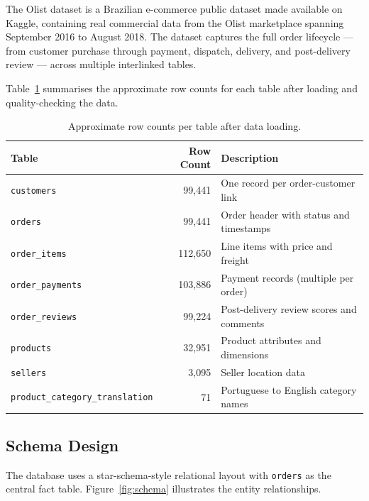 \documentclass[12pt,a4paper]{article}
\begin{document}
The Olist dataset is a Brazilian e-commerce public dataset made available on Kaggle,
containing real commercial data from the Olist marketplace spanning September 2016 to
August 2018. The dataset captures the full order lifecycle — from customer purchase through
payment, dispatch, delivery, and post-delivery review — across multiple interlinked tables.

Table~\ref{tab:row_counts} summarises the approximate row counts for each table after loading
and quality-checking the data.

\begin{table}[H]
    \centering
    \caption{Approximate row counts per table after data loading.}
    \label{tab:row_counts}
    \begin{tabular}{lrl}
        \toprule
        \textbf{Table} & \textbf{Row Count} & \textbf{Description} \\
        \midrule
        \texttt{customers}                  & 99{,}441 & One record per order-customer link \\
        \texttt{orders}                     & 99{,}441 & Order header with status and timestamps \\
        \texttt{order\_items}               & 112{,}650 & Line items with price and freight \\
        \texttt{order\_payments}            & 103{,}886 & Payment records (multiple per order) \\
        \texttt{order\_reviews}             & 99{,}224 & Post-delivery review scores and comments \\
        \texttt{products}                   & 32{,}951 & Product attributes and dimensions \\
        \texttt{sellers}                    & 3{,}095  & Seller location data \\
        \texttt{product\_category\_translation} & 71 & Portuguese to English category names \\
        \bottomrule
    \end{tabular}
\end{table}

\subsection{Schema Design}

The database uses a star-schema-style relational layout with \texttt{orders} as the central
fact table. Figure~\ref{fig:schema} illustrates the entity relationships.
\end{document}
